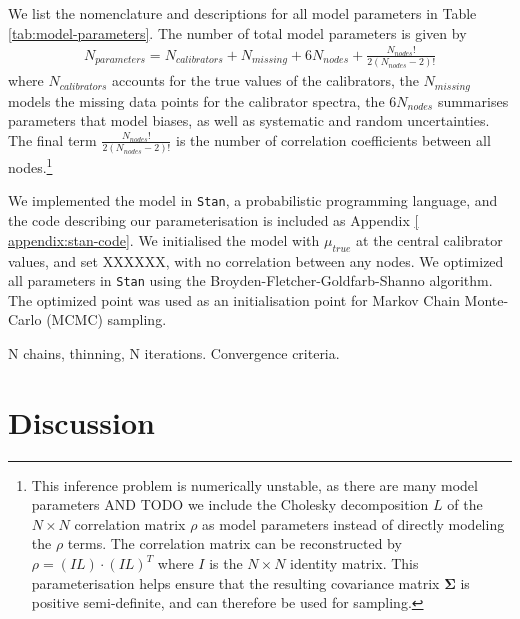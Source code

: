 \documentclass[preprint]{aastex}
\begin{document}
We list the nomenclature and descriptions for all model parameters in Table 
\ref{tab:model-parameters}. The number of total model parameters is given by
\begin{eqnarray}
    N_{parameters} = N_{calibrators} + N_{missing} + 6N_{nodes} + \frac{N_{nodes}!}{2(N_{nodes} - 2)!}
\end{eqnarray}
where $N_{calibrators}$ accounts for the true values of the calibrators, the
$N_{missing}$ models the missing data points for the calibrator spectra, the
$6N_{nodes}$ summarises parameters that model biases, as well as systematic
and random uncertainties. The final term $\frac{N_{nodes}!}{2(N_{nodes} - 2)!}$
is the number of correlation coefficients between all nodes.\footnote{
This inference problem is numerically unstable, as there are many model parameters
AND TODO
we include the Cholesky decomposition $L$ of the $N \times N$ correlation matrix $\rho$
as model parameters instead of directly modeling the $\rho$ terms.  The correlation
matrix can be reconstructed by $\rho = (IL)\cdot(IL)^T$ where $I$ is the $N \times N$
identity matrix. This parameterisation helps ensure that the resulting covariance
matrix $\mathbf{\Sigma}$ is positive semi-definite, and can therefore be used for
sampling.} 



We implemented the model in \texttt{Stan}, a probabilistic programming
language, and the code describing our parameterisation is included as Appendix \ref{
appendix:stan-code}. We initialised the model with $\mu_{true}$ at the central
calibrator values, and set XXXXXX, with no correlation between any nodes. We
optimized all parameters in \texttt{Stan} using the Broyden-Fletcher-Goldfarb-Shanno
algorithm. The optimized point was used as an initialisation point for Markov Chain
Monte-Carlo (MCMC) sampling.

N chains, thinning, N iterations. Convergence criteria.
 
 







\section{Discussion}
\label{sec:discussion}

\end{document}
